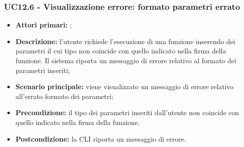 \subsubsection{UC12.6 - Visualizzazione errore: formato parametri errato}
\begin{itemize}
	\item \textbf{Attori primari:} \ua{};
	\item \textbf{Descrizione:} l’utente richiede l’esecuzione di una funzione inserendo dei parametri il cui tipo non coincide con quello indicato nella firma della funzione. Il sistema riporta un messaggio di errore relativo al formato dei parametri inseriti;
	\item \textbf{Scenario principale:} viene visualizzato un messaggio di errore relativo all'errato formato dei parametri;
	\item \textbf{Precondizione:} il  tipo dei parametri inseriti dall'utente non coincide con quello indicato nella firma della funzione. 
	\item \textbf{Postcondizione:} la CLI riporta un messaggio di errore.
\end{itemize}